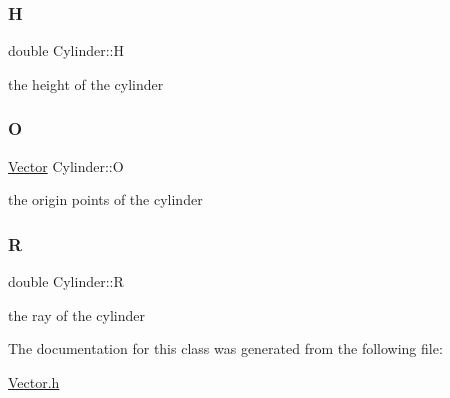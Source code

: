 \subsubsection{\texorpdfstring{H}{H}}
{\footnotesize\ttfamily double Cylinder\+::H}

the height of the cylinder \mbox{\label{classCylinder_a3093b8b66a4194d086cbb6cf700bc32a}} 
\subsubsection{\texorpdfstring{O}{O}}
{\footnotesize\ttfamily \hyperlink{classVector}{Vector} Cylinder\+::O}

the origin points of the cylinder \mbox{\label{classCylinder_a8f4587554355f2a79614f639034f8aaf}} 
\subsubsection{\texorpdfstring{R}{R}}
{\footnotesize\ttfamily double Cylinder\+::R}

the ray of the cylinder 

The documentation for this class was generated from the following file\+:\begin{DoxyCompactItemize}
\item 
\hyperlink{Vector_8h}{Vector.\+h}\end{DoxyCompactItemize}
